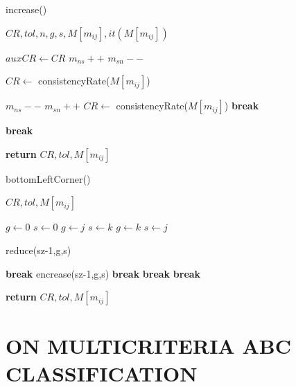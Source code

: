 \documentclass[10pt,fleqn,a4paper,twoside]{article}
\begin{document}
\begin{algorithm}
\caption{increase()}\label{alg:increase}
	\begin{algorithmic}
	\Require $CR, tol, n, g, s, M[m_{ij}], it(M[m_{ij}])$
	
		\State $auxCR \gets CR$
		\State $m_{ns} ++$
		\State $m_{sn} --$
		
		\State $CR \gets$ consistencyRate($M[m_{ij}]$)
		
			\State $m_{ns} --$
			\State $m_{sn} ++$
			\State $CR \gets$ consistencyRate($M[m_{ij}]$)
			\State \textbf{break}
			
			\State \textbf{break}
		\EndIf
\EndWhile

\State \textbf{return} $CR, tol, M[m_{ij}]$	
	
\end{algorithmic}
\end{algorithm}

\begin{algorithm}
\caption{bottomLeftCorner()}\label{alg:bottomLeftCorner}
	\begin{algorithmic}
	\Require $CR, tol, M[m_{ij}]$
	
						\State $g \gets 0$
						\State $s \gets 0$
							\State $g \gets j$
							\State $s \gets k$
							\State $g \gets k$
							\State $s \gets j$
						\EndIf
					
						
							\State reduce(sz-1,g,s)
						
								\State \textbf{break}
								encrease(sz-1,g,s)
									\State \textbf{break}
								\EndIf
							\EndIf
						\EndIf
					\EndIf
				\EndFor
					\State \textbf{break}
				\EndIf
			\EndFor
					\State \textbf{break}
				\EndIf	
		\EndFor
	\EndIf
	
	\State \textbf{return} $CR, tol, M[m_{ij}]$

\end{algorithmic}
\end{algorithm}
    
    \section{ON MULTICRITERIA ABC CLASSIFICATION}
\end{document}
